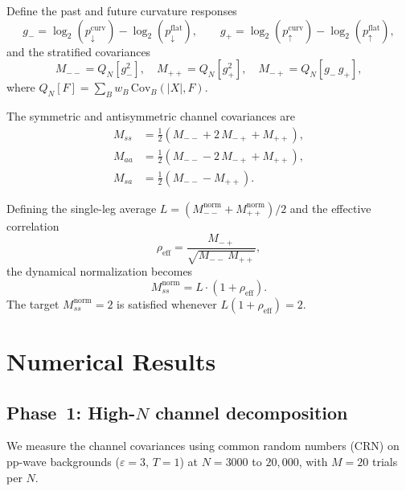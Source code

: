 \documentclass[11pt,a4paper]{article}
\begin{document}
Define the past and future curvature responses
\[
  g_- = \log_2(p_{\downarrow}^{\mathrm{curv}}) - \log_2(p_{\downarrow}^{\mathrm{flat}}),\qquad
  g_+ = \log_2(p_{\uparrow}^{\mathrm{curv}}) - \log_2(p_{\uparrow}^{\mathrm{flat}}),
\]
and the stratified covariances
\[
  M_{--} = Q_N[g_-^2],\quad M_{++} = Q_N[g_+^2],\quad M_{-+} = Q_N[g_-\,g_+],
\]
where $Q_N[F] = \sum_B w_B\,\mathrm{Cov}_B(|X|, F)$.

The symmetric and antisymmetric channel covariances are
\begin{align}
  M_{ss} &= \tfrac{1}{2}(M_{--} + 2\,M_{-+} + M_{++}), \label{eq:Mss}\\
  M_{aa} &= \tfrac{1}{2}(M_{--} - 2\,M_{-+} + M_{++}), \label{eq:Maa}\\
  M_{sa} &= \tfrac{1}{2}(M_{--} - M_{++}). \label{eq:Msa}
\end{align}

Defining the single-leg average $L = (M_{--}^{\mathrm{norm}} + M_{++}^{\mathrm{norm}})/2$
and the effective correlation
\begin{equation}\label{eq:rho}
  \rho_{\mathrm{eff}} = \frac{M_{-+}}{\sqrt{M_{--}\,M_{++}}},
\end{equation}
the dynamical normalization becomes
\begin{equation}\label{eq:constraint}
  M_{ss}^{\mathrm{norm}} = L \cdot (1 + \rho_{\mathrm{eff}}).
\end{equation}
The target $M_{ss}^{\mathrm{norm}} = 2$ is satisfied whenever $L(1 + \rho_{\mathrm{eff}}) = 2$.

\section{Numerical Results}

\subsection{Phase~1: High-$N$ channel decomposition}

We measure the channel covariances using common random numbers (CRN)
on pp-wave backgrounds ($\varepsilon = 3$, $T = 1$) at $N = 3000$ to $20{,}000$,
with $M = 20$ trials per $N$.
\end{document}
